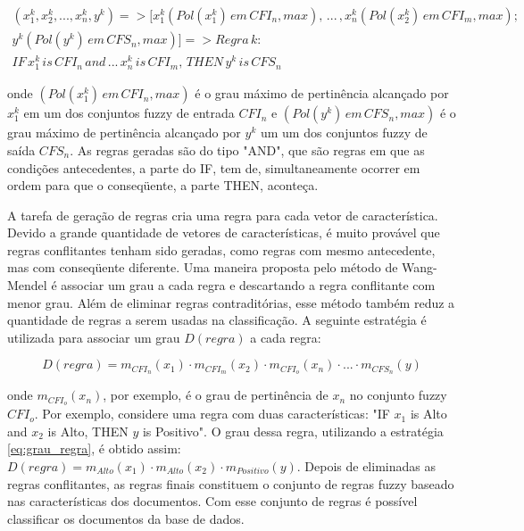 \begin{equation}
\begin{split}
( x_1^k, x_2^k, ... , x_n^k, y^k) => [x_1^k (Pol(x_1^k) \, em \, CFI_n, max), \, ... \, , x_n^k (Pol(x_2^k) \, em \, CFI_m, max); \\
y^k(Pol(y^k) \, em \, CFS_n, max)] => Regra \, k: \\ IF \, x_1^k \, is \, CFI_n \, and \, ... \, x_n^k \, is \, CFI_m, \, THEN \, y^k \, is \, CFS_n
\label{eq:repr_fuzzy_rule}
\end{split}
\end{equation}

onde $(Pol(x_1^k) \, em \, CFI_n, max)$ é o grau máximo de pertinência alcançado por $x_1^k$ em um dos conjuntos fuzzy de entrada $CFI_n$ e $(Pol(y^k) \, em \, CFS_n, max)$ é o grau máximo de pertinência alcançado por $y^k$ um um dos conjuntos fuzzy de saída $CFS_n$. As regras geradas são do tipo "AND", que são regras em que as condições antecedentes, a parte do IF, tem de, simultaneamente ocorrer em ordem para que o conseqüente, a parte THEN, aconteça. 

A tarefa de geração de regras cria uma regra para cada vetor de característica. Devido a grande quantidade de vetores de características, é muito provável que regras conflitantes tenham sido geradas, como regras com mesmo antecedente, mas com conseqüente diferente. Uma maneira proposta pelo método de Wang-Mendel é associar um grau a cada regra e descartando a regra conflitante com menor grau. Além de eliminar regras contraditórias, esse método também reduz a quantidade de regras a serem usadas na classificação. A seguinte estratégia é utilizada para associar um grau $D(regra)$ a cada regra: 

\begin{equation}
D(regra) = m_{CFI_n}(x_1) \cdot m_{CFI_m}(x_2) \cdot m_{CFI_o}(x_n) \cdot ... \cdot m_{CFS_n}(y)
\label{eq:grau_regra}
\end{equation}

onde $m_{CFI_o}(x_n)$, por exemplo, é o grau de pertinência de $x_n$ no conjunto fuzzy $CFI_o$. Por exemplo, considere uma regra com duas características: "IF $x_1$ is Alto and $x_2$ is Alto, THEN $y$ is Positivo". O grau dessa regra, utilizando a estratégia \ref{eq:grau_regra}, é obtido assim:  $D(regra) = m_{Alto}(x_1) \cdot m_{Alto}(x_2) \cdot m_{Positivo}(y)$. Depois de eliminadas as regras conflitantes, as regras finais constituem o conjunto de regras fuzzy baseado nas características dos documentos. Com esse conjunto de regras é possível classificar os documentos da base de dados.

